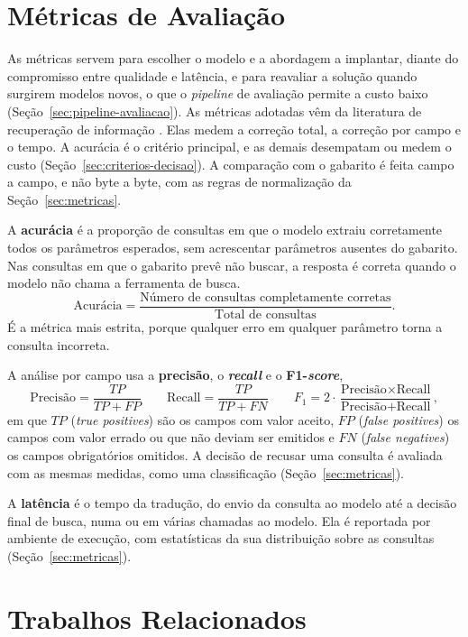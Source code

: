 \section{Métricas de Avaliação}
\label{sec:metricas-conceitos}

As métricas servem para escolher o modelo e a abordagem a implantar, diante do compromisso entre qualidade e latência, e para reavaliar a solução quando surgirem modelos novos, o que o \textit{pipeline} de avaliação permite a custo baixo (Seção~\ref{sec:pipeline-avaliacao}). As métricas adotadas vêm da literatura de recuperação de informação \cite{manning2008introductionir}. Elas medem a correção total, a correção por campo e o tempo. A acurácia é o critério principal, e as demais desempatam ou medem o custo (Seção~\ref{sec:criterios-decisao}). A comparação com o gabarito é feita campo a campo, e não byte a byte, com as regras de normalização da Seção~\ref{sec:metricas}.

A \textbf{acurácia} é a proporção de consultas em que o modelo extraiu corretamente todos os parâmetros esperados, sem acrescentar parâmetros ausentes do gabarito. Nas consultas em que o gabarito prevê não buscar, a resposta é correta quando o modelo não chama a ferramenta de busca.
\[
\text{Acurácia} = \frac{\text{Número de consultas completamente corretas}}{\text{Total de consultas}}.
\]
É a métrica mais estrita, porque qualquer erro em qualquer parâmetro torna a consulta incorreta.

A análise por campo usa a \textbf{precisão}, o \textbf{\textit{recall}} e o \textbf{F1-\textit{score}},
\[
\text{Precisão} = \frac{\mathit{TP}}{\mathit{TP} + \mathit{FP}}
\qquad
\text{Recall} = \frac{\mathit{TP}}{\mathit{TP} + \mathit{FN}}
\qquad
F_1 = 2 \cdot \frac{\text{Precisão} \times \text{Recall}}{\text{Precisão} + \text{Recall}},
\]
em que $\mathit{TP}$ (\textit{true positives}) são os campos com valor aceito, $\mathit{FP}$ (\textit{false positives}) os campos com valor errado ou que não deviam ser emitidos e $\mathit{FN}$ (\textit{false negatives}) os campos obrigatórios omitidos. A decisão de recusar uma consulta é avaliada com as mesmas medidas, como uma classificação (Seção~\ref{sec:metricas}).

A \textbf{latência} é o tempo da tradução, do envio da consulta ao modelo até a decisão final de busca, numa ou em várias chamadas ao modelo. Ela é reportada por ambiente de execução, com estatísticas da sua distribuição sobre as consultas (Seção~\ref{sec:metricas}).

\section{Trabalhos Relacionados}
\label{sec:trabalhos-relacionados}

